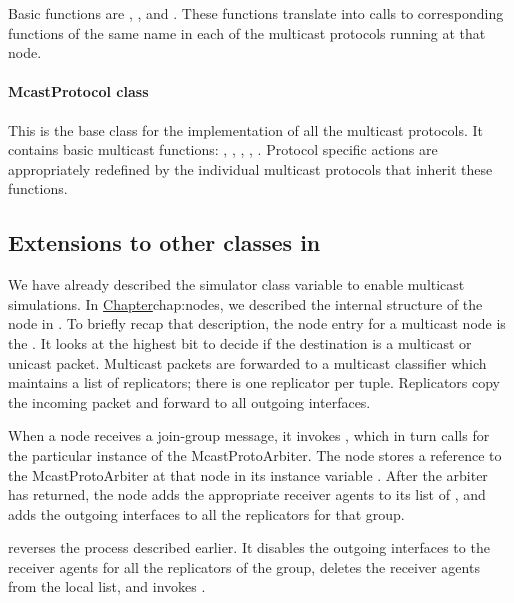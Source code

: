 {Basic functions are , , and
.
These functions translate into calls to corresponding functions of the
same name in each of the multicast protocols running at that node.

\paragraph{McastProtocol class}
This is the base class for the implementation of all the multicast protocols.
It contains basic multicast functions:
, ,
, , .
Protocol specific actions are appropriately redefined
by the individual multicast protocols that inherit these functions.

\subsection{Extensions to other classes in \ns}
We have already described the simulator class variable
 to enable multicast simulations.
In 
\href{the earlier chapter describing nodes in \ns}{Chapter}{chap:nodes},
we described the internal structure of the node in \ns.
To briefly recap that description, the node entry for a multicast node is
the .  It looks at the highest bit to decide
 if the destination is a multicast or unicast packet.
 Multicast packets are forwarded to a multicast
classifier which maintains a list of replicators;
there is one replicator per  tuple.
Replicators copy the incoming packet and forward to all outgoing interfaces.

When a node receives a join-group message,
it invokes , 
which in turn calls
 for the particular instance
of the McastProtoArbiter.
The node stores a reference to the McastProtoArbiter at that node in
its instance variable .
After the arbiter has returned, the node
adds the appropriate receiver agents to its list of ,
and adds the outgoing interfaces to all the replicators for that group.

 reverses the process described earlier.
It disables the outgoing interfaces to the receiver agents
for all the replicators of the group,
deletes the receiver agents from the local  list,
and invokes .

}
